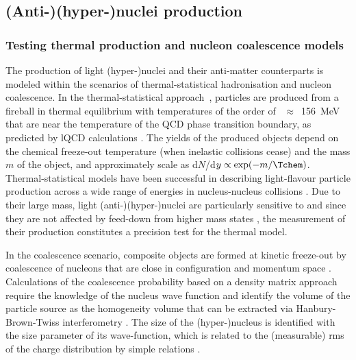 \subsection{(Anti-)(hyper-)nuclei production} 
\label{sec:nuclei}
\subsubsection{Testing thermal production and nucleon coalescence models}
\label{sec:producionmodels}

The production of light (hyper-)nuclei and their anti-matter counterparts is modeled within the scenarios of thermal-statistical hadronisation and nucleon coalescence.
In the thermal-statistical approach~\cite{Andronic:2010qu,Andronic:2017}, particles are produced from a fireball in thermal equilibrium with temperatures of the order of \Tchem~$\approx$~156~MeV that are near the temperature of the QCD phase transition boundary, as predicted by lQCD calculations \cite{Bazavov:2014pvz,Bellwied:2013cta}.
The yields of the produced objects depend on the chemical freeze-out temperature \Tchem (when inelastic collisions cease) and the mass $m$ of the object, and approximately scale as d$N$/d$y \propto \exp(-m/\Tchem)$.  
Thermal-statistical models have been successful in describing light-flavour particle production across a wide range of energies in nucleus-nucleus collisions \cite{Andronic:2017, Acharya:2017bso}.  
Due to their large mass, light (anti-)(hyper-)nuclei are particularly sensitive to \Tchem and since they are not affected by feed-down from higher mass states \cite{Andronic:2017}, the measurement of their production constitutes a precision test for the thermal model.  

In the coalescence scenario, composite objects are formed at kinetic freeze-out by coalescence of nucleons that are close in configuration and momentum space \cite{Butler:1963, Kapusta:1980, Bergstrom:1979gpv, Sato:1981ez, Nagle:1996vp, Scheibl:1998tk}. Calculations of the coalescence probability based on a density matrix approach \cite{Scheibl:1998tk} require the knowledge of the nucleus wave function and identify the volume of the particle source as the homogeneity volume that can be extracted via Hanbury-Brown-Twiss interferometry \cite{Wiedemann:1999qn}. 
The size of the (hyper-)nucleus is identified with the size parameter of its wave-function, which is related to the (measurable) rms of the charge distribution by simple relations \cite{Sato:1981ez, Bellini:2018epz}. 


